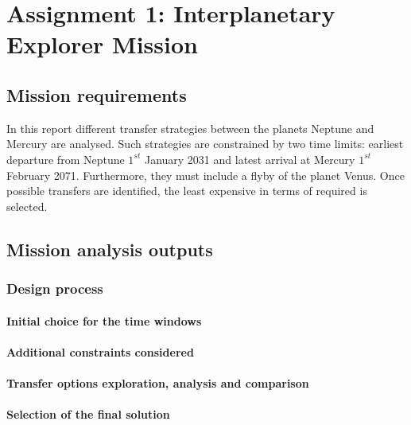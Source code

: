 \documentclass[11pt,a4paper]{report}
\begin{document}
\printnomenclature
\tableofcontents

\part{Assignment 1: Interplanetary Explorer Mission}

\chapter{Mission requirements}
In this report different transfer strategies between the planets Neptune and Mercury are analysed.
Such strategies are constrained by two time limits: earliest departure from Neptune $1^{st}$ January 2031 and latest arrival at Mercury $1^{st}$ February 2071. Furthermore, they must include a flyby of the planet Venus.
Once possible transfers are identified, the least expensive in terms of  required is selected.

\chapter{Mission analysis outputs}

\section{Design process}

\subsection{Initial choice for the time windows}

\subsection{Additional constraints considered}

\subsection{Transfer options exploration, analysis and comparison}

\subsection{Selection of the final solution}
\end{document}
